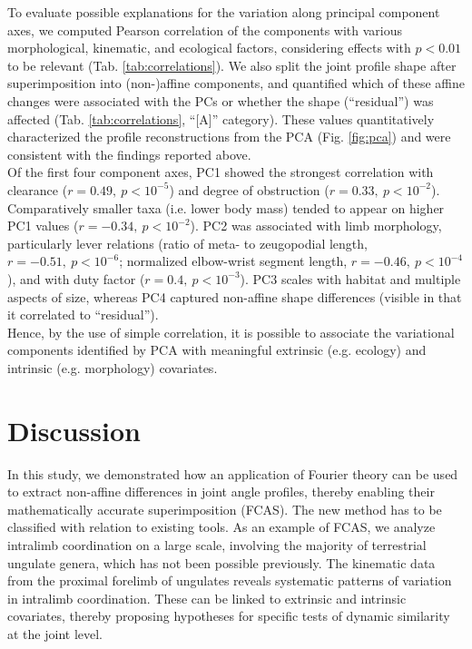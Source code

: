 To evaluate possible explanations for the variation along principal component axes, we computed Pearson correlation of the components with various morphological, kinematic, and ecological factors, considering effects with $p<0.01$ to be relevant (Tab. \ref{tab:correlations}).
We also split the joint profile shape after superimposition into (non-)affine components, and quantified which of these affine changes were associated with the PCs or whether the shape (``residual'') was affected (Tab. \ref{tab:correlations}, ``[A]'' category).
These values quantitatively characterized the profile reconstructions from the PCA (Fig. \ref{fig:pca}) and were consistent with the findings reported above.
\\Of the first four component axes, PC1 showed the strongest correlation with clearance ($r = 0.49,\ p < 10^{-5}$) and degree of obstruction ($r = 0.33,\ p < 10^{-2}$).
Comparatively smaller taxa (i.e. lower body mass) tended to appear on higher PC1 values ($r = -0.34,\ p < 10^{-2}$).
PC2 was associated with limb morphology, particularly lever relations (ratio of meta- to zeugopodial length, $r = -0.51,\ p < 10^{-6}$; normalized elbow-wrist segment length, $r = -0.46,\ p < 10^{-4}$), and with duty factor ($r = 0.4,\ p < 10^{-3}$).
PC3 scales with habitat and multiple aspects of size, whereas PC4 captured non-affine shape differences (visible in that it correlated to ``residual'').
\\Hence, by the use of simple correlation, it is possible to associate the variational components identified by PCA with meaningful extrinsic (e.g. ecology) and intrinsic (e.g. morphology) covariates.



\FloatBarrier\clearpage
\section{Discussion}
In this study, we demonstrated how an application of Fourier theory can be used to extract non-affine differences in joint angle profiles, thereby enabling their mathematically accurate superimposition (FCAS).
The new method has to be classified with relation to existing tools.
As an example of FCAS, we analyze intralimb coordination on a large scale, involving the majority of terrestrial ungulate genera, which has not been possible previously.
The kinematic data from the proximal forelimb of ungulates reveals systematic patterns of variation in intralimb coordination.
These can be linked to extrinsic and intrinsic covariates, thereby proposing hypotheses for specific tests of dynamic similarity at the joint level.


